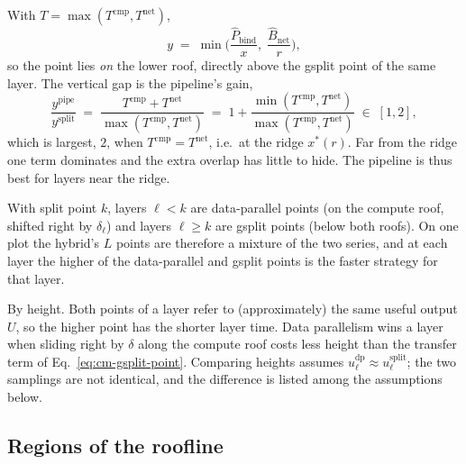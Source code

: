 With $T = \max(T^{\mathrm{cmp}}, T^{\mathrm{net}})$,
\begin{equation}
  y \;=\; \min\!\Big( \frac{\hat{P}_{\mathrm{bind}}}{x},\; \frac{\hat{B}_{\mathrm{net}}}{r} \Big),
  \label{eq:cm-pipe-point}
\end{equation}
so the point lies \emph{on} the lower roof, directly above the gsplit point of the same layer.
The vertical gap is the pipeline's gain,
\begin{equation}
  \frac{y^{\mathrm{pipe}}}{y^{\mathrm{split}}} \;=\; \frac{T^{\mathrm{cmp}} + T^{\mathrm{net}}}{\max(T^{\mathrm{cmp}}, T^{\mathrm{net}})}
  \;=\; 1 + \frac{\min(T^{\mathrm{cmp}}, T^{\mathrm{net}})}{\max(T^{\mathrm{cmp}}, T^{\mathrm{net}})}
  \;\in\; [1, 2],
  \label{eq:cm-pipe-gain}
\end{equation}
which is largest, $2$, when $T^{\mathrm{cmp}} = T^{\mathrm{net}}$, i.e.\ at the ridge
$x^{*}(r)$. Far from the ridge one term dominates and the extra overlap has little to hide.
The pipeline is thus best for layers near the ridge.

With split point $k$, layers $\ell < k$ are data-parallel points (on the compute roof, shifted
right by $\delta_\ell$) and layers $\ell \ge k$ are gsplit points (below both roofs). On one plot
the hybrid's $L$ points are therefore a mixture of the two series, and at each layer the higher of
the data-parallel and gsplit points is the faster strategy for that layer.

By height. Both points of a layer refer to (approximately) the same useful output $U$, so the
higher point has the shorter layer time. Data parallelism wins a layer when sliding right by
$\delta$ along the compute roof costs less height than the transfer term of
Eq.~\eqref{eq:cm-gsplit-point}. Comparing heights assumes $u^{\mathrm{dp}}_\ell \approx
u^{\mathrm{split}}_\ell$; the two samplings are not identical, and the difference is listed among
the assumptions below.

\subsection{Regions of the roofline}
\label{sec:cm-regions}

